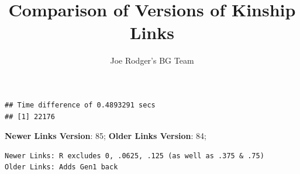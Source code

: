 \documentclass[a4paper]{article}\usepackage[]{graphicx}\usepackage[]{color}
\title{Comparison of Versions of Kinship Links}
\author{Joe Rodger's BG Team}
\makeatletter
\newenvironment{kframe}{%
 \def\at@end@of@kframe{}%
 \ifinner\ifhmode%
  \def\at@end@of@kframe{\end{minipage}}%
  \begin{minipage}{\columnwidth}%
 \fi\fi%
 \def\FrameCommand##1{\hskip\@totalleftmargin \hskip-\fboxsep
 \colorbox{shadecolor}{##1}\hskip-\fboxsep
     \hskip-\linewidth \hskip-\@totalleftmargin \hskip\columnwidth}%
 \MakeFramed {\advance\hsize-\width
   \@totalleftmargin\z@ \linewidth\hsize
   \@setminipage}}%
 {\par\unskip\endMakeFramed%
 \at@end@of@kframe}
\newenvironment{knitrout}{}{} %
\makeatother
\begin{document}
\maketitle

\setlength{\parindent}{0pt}%
















\begin{knitrout}
\color{fgcolor}\begin{kframe}
\begin{verbatim}
## Time difference of 0.4893291 secs
## [1] 22176
\end{verbatim}
\end{kframe}
\end{knitrout}



\textbf{Newer Links Version}: 85;
\textbf{Older Links Version}: 84;




\begin{knitrout}
\color{fgcolor}\begin{kframe}
\begin{verbatim}
Newer Links: R excludes 0, .0625, .125 (as well as .375 & .75)
Older Links: Adds Gen1 back
\end{verbatim}
\end{kframe}
\end{knitrout}
\end{document}
